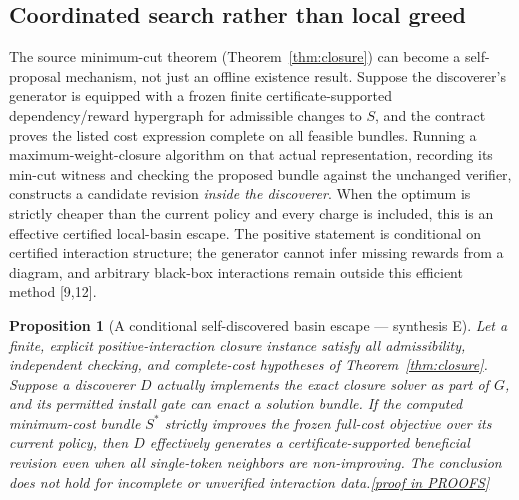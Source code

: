 \documentclass[11pt,letterpaper]{article}
\newtheorem{proposition}[theorem]{Proposition}
\theoremstyle{definition}
\theoremstyle{remark}
\newcommand{\prooflink}[1]{\hfill\hyperlink{proof:#1}{\footnotesize[proof in PROOFS]}}
\newcommand{\src}[1]{\textup{[#1]}}
\begin{document}
\subsection{Coordinated search rather than local greed}\label{sec:basin-link}
The source minimum-cut theorem (Theorem~\ref{thm:closure}) can become a self-proposal mechanism, not just an offline existence result. Suppose the discoverer's generator is equipped with a frozen finite certificate-supported dependency/reward hypergraph for admissible changes to $S$, and the contract proves the listed cost expression complete on all feasible bundles. Running a maximum-weight-closure algorithm on that actual representation, recording its min-cut witness and checking the proposed bundle against the unchanged verifier, constructs a candidate revision \emph{inside the discoverer}. When the optimum is strictly cheaper than the current policy and every charge is included, this is an effective certified local-basin escape. The positive statement is conditional on certified interaction structure; the generator cannot infer missing rewards from a diagram, and arbitrary black-box interactions remain outside this efficient method \src{9,12}.

\begin{proposition}[A conditional self-discovered basin escape --- synthesis E]\label{prop:selfescape}\hypertarget{claim:selfescape}{}
Let a finite, explicit positive-interaction closure instance satisfy all admissibility, independent checking, and complete-cost hypotheses of Theorem~\ref{thm:closure}. Suppose a discoverer $D$ actually implements the exact closure solver as part of $G$, and its permitted install gate can enact a solution bundle. If the computed minimum-cost bundle $S^*$ strictly improves the frozen full-cost objective over its current policy, then $D$ effectively generates a certificate-supported beneficial revision even when all single-token neighbors are non-improving. The conclusion does not hold for incomplete or unverified interaction data.\prooflink{selfescape}
\end{proposition}
\end{document}
